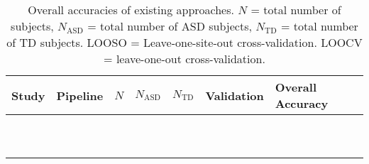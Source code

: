 \documentclass[10pt]{article}
\begin{document}
\begin{table}
	\caption{Overall accuracies of existing approaches. \(N\) = total number of subjects, \(N_{\text{ASD}}\) =
    total number of ASD subjects, \(N_{\text{TD}}\) = total number of TD subjects. LOOSO =
    Leave-one-site-out cross-validation. LOOCV = leave-one-out cross-validation.}
	\centering
	\begin{tabular}{lllllll}
		\toprule
		Study                                                         & Pipeline     & \(N\) & \(N_\text{ASD}\) & \(N_{\text{TD}}\) & Validation & Overall Accuracy \\
		\midrule
    \citet{heinsfeldIdentificationAutismSpectrum2018}             &              &       &                  &                   &            &                  \\
    \citet{eslamiASDDiagNetHybridLearning2019}                    &              &       &                  &                   &            &                  \\
    \citet{yinDiagnosisAutismSpectrum2021}                        &              &       &                  &                   &            &                  \\
		\citet{liMultisiteFMRIAnalysis2020}                           &              &       &                  &                   &            &                  \\
		\citet{el-gazzarHybrid3DCNN3DCLSTM2019}                       &              &       &                  &                   &            &                  \\
    \citet{shaoClassificationASDBased2021}                        &              &       &                  &                   &            &                  \\
    \citet{dekhilUsingRestingState2018}                           &              &       &                  &                   &            &                  \\
    \citet{parisotDiseasePredictionUsing2018}                     &              &       &                  &                   &            &                  \\
    \citet{sakaiMachineLearningStudies2019}                       &              &       &                  &                   &            &                  \\
    \citet{iidakaRestingStateFunctional2015}                      &              &       &                  &                   &            &                  \\

\end{tabular}
\end{table}
\end{document}
